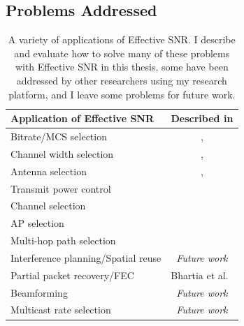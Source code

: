 


\subsection{Problems Addressed}
\begin{table}[htp]
	\centering
	\begin{tabular}{lc}
	\toprule
		Application of Effective SNR & Described in \\
	\midrule
		Bitrate/MCS selection & \chapref{chap:delivery}, \chapref{chap:rate}\\
		Channel width selection & \chapref{chap:delivery}, \chapref{chap:rate}\\
		Antenna selection & \chapref{chap:delivery}, \chapref{chap:rate}\\
		Transmit power control & \chapref{chap:delivery}\\
		Channel selection & \chapref{chap:applications}\\
		AP selection & \chapref{chap:applications}\\
		Multi-hop path selection & \chapref{chap:applications}\\
		Interference planning/Spatial reuse & \emph{Future work}\\
		Partial packet recovery/FEC & Bhartia et al.~\cite{Bhartia_FreqDiv}\\
		Beamforming & \emph{Future work}\\
		Multicast rate selection & \emph{Future work}\\
	\bottomrule
	\end{tabular}
	\caption[A variety of applications of Effective SNR]{\label{tab:esnr_uses}A variety of applications of Effective SNR. I describe and evaluate how to solve many of these problems with Effective SNR in this thesis, some have been addressed by other researchers using my research platform, and I leave some problems for future work.}
\end{table}

